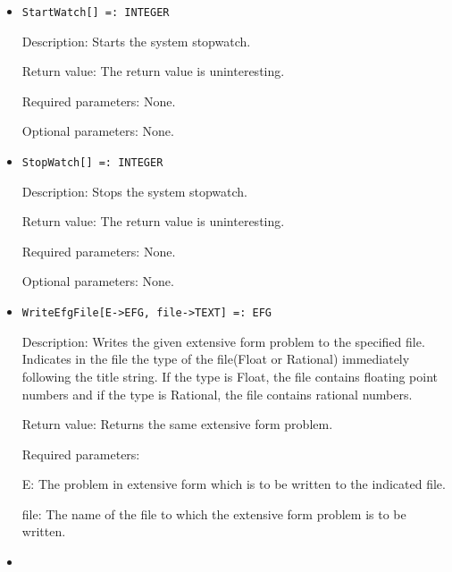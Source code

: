 \begin{itemize}
\item

\protect \large \begin{verbatim}
StartWatch[] =: INTEGER
\end{verbatim}\normalsize

\bd
\item
[Description:] Starts the system stopwatch.  
\item
[Return value:] The return value is uninteresting.
\item
[Required parameters:] None.
\item
[Optional parameters:] None.
\ed

\item
\protect \large \begin{verbatim}
StopWatch[] =: INTEGER
\end{verbatim}\normalsize

\bd
\item
[Description:] Stops the system stopwatch.  
\item
[Return value:] The return value is uninteresting.
\item
[Required parameters:] None.
\item
[Optional parameters:] None.
\ed

\item

\protect \large \begin{verbatim}
WriteEfgFile[E->EFG, file->TEXT] =: EFG
\end{verbatim}\normalsize

\bd
\item
[Description:] Writes the given extensive form problem to the specified 
file.  Indicates in the file the type of the file(Float or Rational) 
immediately following the title string.  If the type is Float, the file
contains floating point numbers and if the type is Rational, the file
contains rational numbers.  
\item
[Return value:] Returns the same extensive form problem.
\item
[Required parameters:]\hfil\null

\bd
\item
[ E:] The problem in extensive form which is to be written to the
indicated file.
\item
[ file:] The name of the file to which the extensive form problem is
to be written.
\ed
\ed

\item


\end{itemize}
